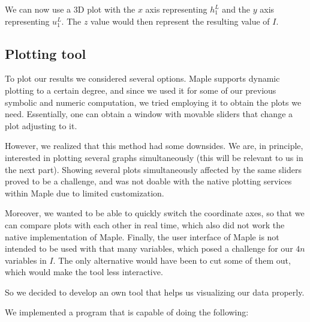 \documentclass[a4paper, twoside]{article}
\newcommand{\todo}[2][]{\textcolor{red}{TODO\ifthenelse{\equal{#1}{}}{}{[#1]}: #2}}
\begin{document}
We can now use a 3D plot with the $x$ axis representing $h_1^L$ and the $y$ axis representing $u_1^L$. The $z$ value would then represent the resulting value of $I$.

\subsection{Plotting tool}
\label{sec:plotting-tool-intro}

To plot our results we considered several options. Maple supports dynamic plotting to a certain degree, and since we used it for some of our previous symbolic and numeric computation, we tried employing it to obtain the plots we need. Essentially, one can obtain a window with movable sliders that change a plot adjusting to it.

However, we realized that this method had some downsides. We are, in principle, interested in plotting several graphs simultaneously (this will be relevant to us in the next part). Showing several plots simultaneously affected by the same sliders proved to be a challenge, and was not doable with the native plotting services within Maple due to limited customization.


Moreover, we wanted to be able to quickly switch the coordinate axes, so that we can compare plots with each other in real time, which also did not work the native implementation of Maple. Finally, the user interface of Maple is not intended to be used with that many variables, which posed a challenge for our $4n$ variables in $I$. The only alternative would have been to cut some of them out, which would make the tool less interactive.

So we decided to develop an own tool that helps us visualizing our data properly.

We implemented a program that is capable of doing the following:
\end{document}
